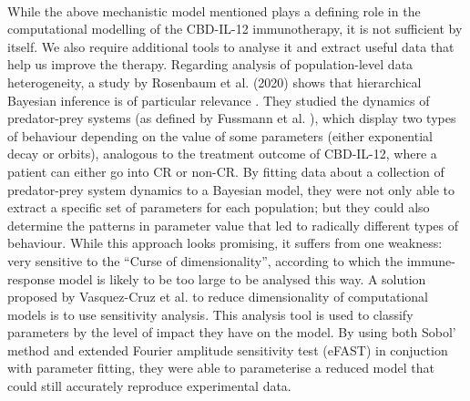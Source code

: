 \documentclass[11pt]{article}
\begin{document}
~ %
\par While the above mechanistic model mentioned plays a defining role in the computational modelling of the CBD-IL-12 immunotherapy, it is not sufficient by itself. We also require additional tools to analyse it and extract useful data that help us improve the therapy. Regarding analysis of population-level data heterogeneity, a study by Rosenbaum et al. (2020) shows that hierarchical Bayesian inference is of particular relevance \cite{rosenbaum}. They studied the dynamics of predator-prey systems (as defined by Fussmann et al. \cite{fussmann}), which display two types of behaviour depending on the value of some parameters (either exponential decay or orbits), analogous to the treatment outcome of CBD-IL-12, where a patient can either go into CR or non-CR. By fitting data about a collection of predator-prey system dynamics to a Bayesian model, they were not only able to extract a specific set of parameters for each population; but they could also determine the patterns in parameter value that led to radically different types of behaviour. While this approach looks promising, it suffers from one weakness: very sensitive to the ``Curse of dimensionality'', according to which the immune-response model is likely to be too large to be analysed this way. A solution proposed by Vasquez-Cruz et al. \cite{tomgro} to reduce dimensionality of computational models is to use sensitivity analysis. This analysis tool is used to classify parameters by the level of impact they have on the model. By using both Sobol' method and extended Fourier amplitude sensitivity test (eFAST) in conjuction with parameter fitting, they were able to parameterise a reduced model that could still accurately reproduce experimental data.

~ %

\par  
\end{document}
